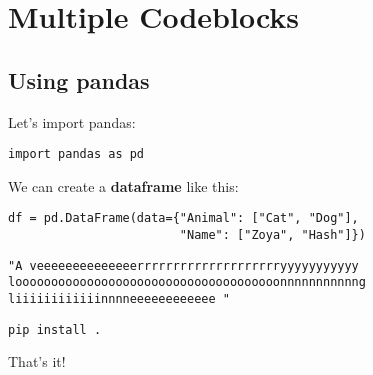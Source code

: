 \documentclass[10pt]{report}
\begin{document}
\chapter{Multiple Codeblocks}\label{ch:Multiple Codeblocks}

\section{Using pandas}


Let's import pandas:


\begin{verbatim}
import pandas as pd
\end{verbatim}
            

We can create a \textbf{dataframe} like this:


\begin{verbatim}
df = pd.DataFrame(data={"Animal": ["Cat", "Dog"],
                        "Name": ["Zoya", "Hash"]})
\end{verbatim}
            


\begin{verbatim}
"A veeeeeeeeeeeeeerrrrrrrrrrrrrrrrrrrryyyyyyyyyyy looooooooooooooooooooooooooooooooooooonnnnnnnnnnng liiiiiiiiiiiinnnneeeeeeeeeeee "
\end{verbatim}
            


\begin{verbatim}
pip install .
\end{verbatim}
            

That's it!
\end{document}
